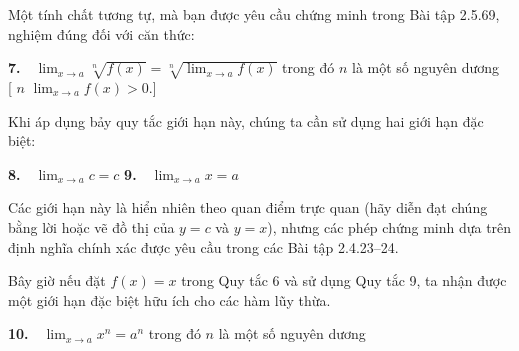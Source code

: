 \begin{minipage}[t]{0.71\textwidth}
    Một tính chất tương tự, mà bạn được yêu cầu chứng minh trong Bài tập 2.5.69, nghiệm đúng đối với căn thức:

    \begin{tcolorbox}[
        sharp corners,
        colback=white,
        colframe=stewartred,
        boxrule=0.75pt,
        left=10pt, right=10pt, top=5pt, bottom=6pt,
        before skip=6pt, after skip=7pt
    ]
    \textbf{\color{stewartred}7.}\ \, $\displaystyle \lim_{x \to a} \sqrt[n]{f(x)} = \sqrt[n]{\lim_{x \to a} f(x)}$ \qquad\quad trong đó $n$ là một số nguyên dương\\[5pt]
    \hspace*{16pt}[ $n$  $\displaystyle\lim_{x \to a} f(x) > 0$.]
    \end{tcolorbox}

    Khi áp dụng bảy quy tắc giới hạn này, chúng ta cần sử dụng hai giới hạn đặc biệt:

    \begin{tcolorbox}[
        sharp corners,
        colback=white,
        colframe=stewartred,
        boxrule=0.75pt,
        left=10pt, right=10pt, top=6pt, bottom=6pt,
        before skip=6pt, after skip=7pt
    ]
    \textbf{\color{stewartred}8.}\ \, $\displaystyle \lim_{x \to a} c = c$ \hspace{0.30\textwidth} \textbf{\color{stewartred}9.}\ \, $\displaystyle \lim_{x \to a} x = a$
    \end{tcolorbox}

    Các giới hạn này là hiển nhiên theo quan điểm trực quan (hãy diễn đạt chúng bằng lời hoặc vẽ đồ thị của $y = c$ và $y = x$), nhưng các phép chứng minh dựa trên định nghĩa chính xác được yêu cầu trong các Bài tập 2.4.23--24.

    Bây giờ nếu đặt $f(x) = x$ trong Quy tắc 6 và sử dụng Quy tắc 9, ta nhận được một giới hạn đặc biệt hữu ích cho các hàm lũy thừa.

    \begin{tcolorbox}[
        sharp corners,
        colback=white,
        colframe=stewartred,
        boxrule=0.75pt,
        left=10pt, right=10pt, top=5pt, bottom=5pt,
        before skip=6pt, after skip=6pt
    ]
    \textbf{\color{stewartred}10.}\ \, $\displaystyle \lim_{x \to a} x^n = a^n$ \qquad\quad trong đó $n$ là một số nguyên dương
    \end{tcolorbox}
\end{minipage}
